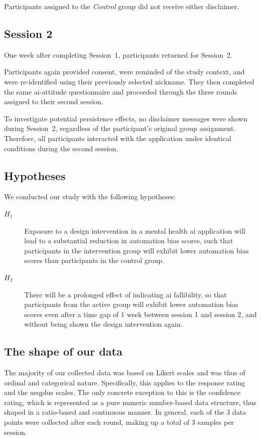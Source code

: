 \documentclass[sigconf,natbib=false]{acmart}
\begin{document}
Participants assigned to the \textit{Control} group did not receive either disclaimer.

\subsection{Session 2}

One week after completing Session~1, participants returned for Session~2.

Participants again provided consent, were reminded of the study context, and were re-identified using their previously selected nickname.
They then completed the same \Gls{ai}-attitude questionnaire and proceeded through the three rounds assigned to their second session.

To investigate potential persistence effects, no disclaimer messages were shown during Session~2, regardless of the participant's original group assignment.
Therefore, all participants interacted with the application under identical conditions during the second session.

\subsection{Hypotheses}
We conducted our study with the following hypotheses:

\begin{description}
\item[$H_1$] Exposure to a design intervention in a mental health \Gls{ai} application will lead to a substantial reduction in automation bias scores, such that participants in the intervention group will exhibit lower automation bias scores than participants in the control group.

\item[$H_2$] There will be a prolonged effect of indicating \gls{ai} fallibility, so that participants from the active group will exhibit lower automation bias scores even after a time gap of 1 week between session 1 and session 2, and without being shown the design intervention again.
\end{description}


\subsection{The shape of our data}
The majority of our collected data was based on Likert scales and was thus of ordinal and categorical nature.
Specifically, this applies to the response rating and the \gls{ueqplus} scales.
The only concrete exception to this is the confidence rating, which is represented as a pure numeric number-based data structure, thus shaped in a ratio-based and continuous manner.
In general, each of the 3 data points were collected after each round, making up a total of 3 samples per session.
\end{document}
